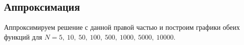 \documentclass[12pt, a4paper]{article}
\begin{document}
	
	\vspace{0.5cm}
	\newpage
	
	\subsection{Аппроксимация}
	\vspace{0.5cm}
	Аппроксимируем решение с данной правой частью и построим графики обеих функций для 
	$N = 5,\ 10,\ 50,\ 100,\ 500,\ 1000,\ 5000,\ 10000$.\\
	\begin{figure}[h]
		\begin{minipage}[h]{0.47\linewidth}
			\\
		\end{minipage}
		\hfill
		\begin{minipage}[h]{0.47\linewidth}
			\\

\end{minipage}
\end{figure}
\end{document}

